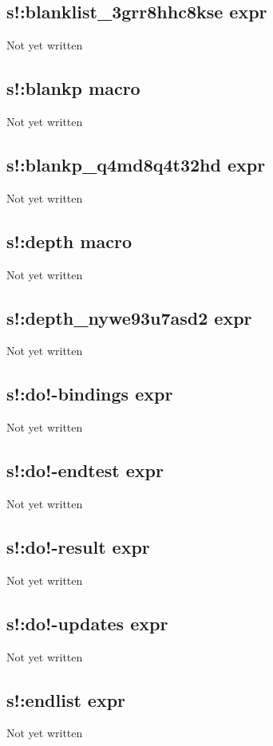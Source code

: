 \documentclass[a4paper,11pt]{article}
\begin{document}
\subsection{\ttfamily s!:blanklist\_3grr8hhc8kse expr}
Not yet written

\subsection{\ttfamily s!:blankp macro}
Not yet written

\subsection{\ttfamily s!:blankp\_q4md8q4t32hd expr}
Not yet written

\subsection{\ttfamily s!:depth macro}
Not yet written

\subsection{\ttfamily s!:depth\_nywe93u7asd2 expr}
Not yet written

\subsection{\ttfamily s!:do!-bindings expr}
Not yet written

\subsection{\ttfamily s!:do!-endtest expr}
Not yet written

\subsection{\ttfamily s!:do!-result expr}
Not yet written

\subsection{\ttfamily s!:do!-updates expr}
Not yet written

\subsection{\ttfamily s!:endlist expr}
Not yet written
\end{document}
